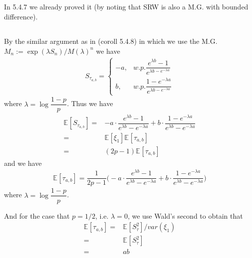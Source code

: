 \documentclass[11pt,a4paper]{ctexart}
\numberwithin{equation}{section}%
\begin{document}
\subsection{}
In 5.4.7 we already proved it (by noting that SRW is also a M.G. with bounded difference).

\subsection{}

By the similar argument as in (coroll 5.4.8) in which we use the M.G. $ M_n := \exp( \lambda  S_n  )/M(\lambda )^{n} $ we have
\begin{align*}
    S_{\tau_{a,b}}=\begin{cases}
        -a,&w.p. \dfrac{ e^{\lambda b } -1 }{ e^{\lambda b - e^{-\lambda a}} } \\
        b,&w.p. \dfrac{ 1-e^{-\lambda a}  }{ e^{\lambda b - e^{-\lambda a}} }
    \end{cases} 
\end{align*}
where $ \lambda = \log\dfrac{ 1-p }{ p } $. Thus we have
\begin{align*}
    \mathbb{E}_{  }\left[ S_{\tau_{a,b}} \right]  =& -a\cdot \dfrac{ e^{\lambda b } -1 }{ e^{\lambda b }- e^{-\lambda a} } + b\cdot \dfrac{ 1- e^{-\lambda a}  }{ e^{\lambda b }- e^{-\lambda a} }\\
    =& \mathbb{E}_{  }\left[\xi _1 \right]\mathbb{E}_{  }\left[ \tau_{a,b} \right]\\
    =&(2p-1)\mathbb{E}_{  }\left[ \tau_{a,b} \right]  
\end{align*}
and we have
\begin{align*}
    \mathbb{E}_{  }\left[ \tau_{a,b} \right] = \dfrac{ 1 }{ 2p-1 }\big(  -a\cdot \dfrac{ e^{\lambda b } -1 }{ e^{\lambda b }- e^{-\lambda a} } + b\cdot \dfrac{ 1- e^{-\lambda a}  }{ e^{\lambda b }- e^{-\lambda a} } \big) 
\end{align*}
where $ \lambda = \log\dfrac{ 1-p }{ p } $.

And for the case that $ p=1/2 $, i.e. $ \lambda = 0 $, we use Wald's second to obtain that
\begin{align*}
    \mathbb{E}_{  }\left[ \tau_{a,b} \right] = &\mathbb{E}_{  }\left[ S_\tau^2 \right] / var(\xi _1)\\
    =& \mathbb{E}_{  }\left[ S_\tau^2 \right] \\
    =& ab 
\end{align*}


\subsection{}
\end{document}
